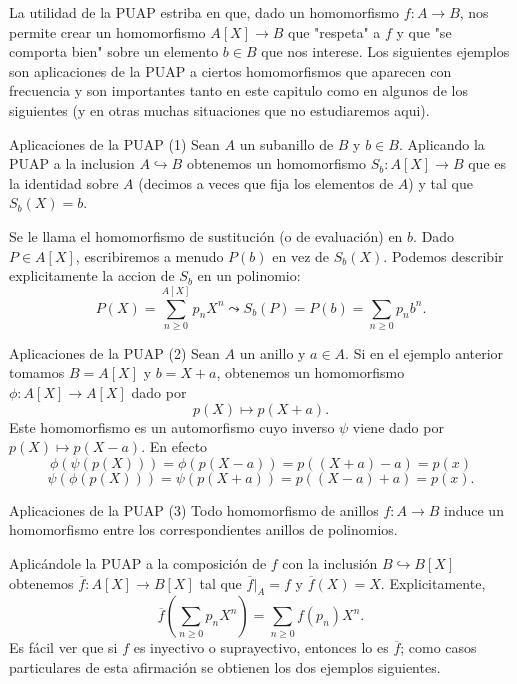 La utilidad de la PUAP estriba en que, dado un homomorfismo \(f:A\to B\), nos permite crear un homomorfismo \(A[X]\to B\) que "respeta" a \(f\) y que "se comporta bien" sobre un elemento \(b\in B\) que nos interese. Los siguientes ejemplos son aplicaciones de la PUAP a ciertos homomorfismos que aparecen con frecuencia y son importantes tanto en este capitulo como en algunos de los siguientes (y en otras muchas situaciones que no estudiaremos aqui).

\begin{example}{Aplicaciones de la PUAP (1)}{}
Sean \(A\) un subanillo de \(B\) y \(b\in B\). Aplicando la PUAP a la inclusion \(A\hookrightarrow B\) obtenemos un homomorfismo \(S_{b}:A[X]\to B\) que es la identidad sobre \(A\) (decimos a veces que fija los elementos de \(A\)) y tal que \(S_{b}(X)=b\).

Se le llama el homomorfismo de sustitución (o de evaluación) en \(b\). Dado \(P\in A[X]\), escribiremos a menudo \(P(b)\) en vez de \(S_{b}(X)\). Podemos describir explicitamente la accion de \(S_{b}\) en un polinomio:
\[
P(X)=\sum_{n\geq 0}^{A[X]}p_{n}X^{n} \leadsto S_{b}(P)=P(b)=\sum_{n \geq 0}p_{n}b^{n}.
\]
\end{example}

\begin{example}{Aplicaciones de la PUAP (2)}{}
Sean \(A\) un anillo y \(a \in A\). Si en el ejemplo anterior tomamos \(B = A[X]\) y \(b = X + a\), obtenemos un homomorfismo \(\phi: A[X] \to A[X]\) dado por \[ p(X) \mapsto p(X + a). \] Este homomorfismo es un automorfismo cuyo inverso \(\psi\) viene dado por \(p(X) \mapsto p(X - a)\). En efecto
\[
\phi(\psi(p(X))) = \phi(p(X - a)) = p((X + a) - a) = p(x)
\]
\[
\psi(\phi(p(X))) = \psi(p(X + a)) = p((X - a) + a) = p(x).
\]
\end{example}    

\begin{example}{Aplicaciones de la PUAP (3)}{}
Todo homomorfismo de anillos \(f : A \to B\) induce un homomorfismo entre los correspondientes anillos de polinomios.

Aplicándole la PUAP a la composición de \(f\) con la inclusión \(B \hookrightarrow B[X]\) obtenemos \(\overline{f} : A[X] \to B[X]\) tal que \(\overline{f} |_{A} = f\) y \(\overline{f}(X) = X\). Explicitamente,
\[
\overline{f} \left( \sum_{n \geq 0} p_n X^n \right) = \sum_{n \geq 0} f(p_n) X^n.
\]
Es fácil ver que si \(f\) es inyectivo o suprayectivo, entonces lo es \(\overline{f}\); como casos particulares de esta afirmación se obtienen los dos ejemplos siguientes.
\end{example}


